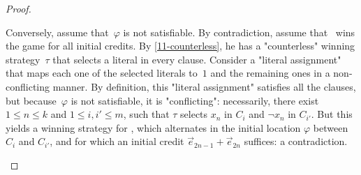 \begin{proof}
\begin{scope}
    Conversely, assume that~$\varphi$ is not satisfiable.  By
    contradiction, assume that \Adam\ wins the game for all initial
    credits.  By \cref{11-counterless}, he has a "counterless" winning
    strategy~$\tau$ that selects a literal in every clause.  Consider
    a "literal assignment" that maps each one of the selected literals
    to~$1$ and the remaining ones in a non-conflicting manner.  By
    definition, this "literal assignment" satisfies all the clauses,
    but because~$\varphi$ is not satisfiable, it is "conflicting":
    necessarily, there exist $1\leq n\leq k$ and $1\leq i,i'\leq m$,
    such that $\tau$ selects $x_n$ in $C_i$ and $\neg x_n$ in
    $C_{i'}$.  But this yields a winning strategy for \Eve, which
    alternates in the initial location $\varphi$ between $C_{i}$
    and $C_{i'}$, and for which an initial credit
    $\vec e_{2n-1}+\vec e_{2n}$ suffices: a contradiction.
  \end{scope}

\end{proof}
